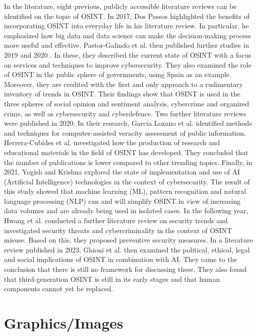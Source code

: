 \documentclass[10pt]{article}
\begin{document}
In the literature, eight previous, publicly accessible literature reviews can be identified on the topic of OSINT. In 2017, Dos Passos \cite{DosPassos.2017} highlighted the benefits of incorporating OSINT into everyday life in his literature review. In particular, he emphasized how big data and data science can make the decision-making process more useful and effective. Pastor-Galindo et al. then published further studies in 2019 \cite{PastorGalindo.2019} and 2020 \cite{PastorGalindo.2020}. In these, they described the current state of OSINT with a focus on services and techniques to improve cybersecurity. They also examined the role of OSINT in the public sphere of governments, using Spain as an example. Moreover, they are credited with the first and only approach to a rudimentary inventory of trends in OSINT. Their findings show that OSINT is used in the three spheres of social opinion and sentiment analysis, cybercrime and organized crime, as well as cybersecurity and cyberdefence. Two further literature reviews were published in 2020. In their research, García Lozano et al. \cite{GarciaLozano.2020} identified methods and techniques for computer-assisted veracity assessment of public information. Herrera-Cubides et al. \cite{HerreraCubides.2020} investigated how the production of research and educational materials in the field of OSINT has developed. They concluded that the number of publications is lower compared to other trending topics. Finally, in 2021, Yogish and Krishna \cite{Yogish.2021} explored the state of implementation and use of AI (Artificial Intelligence) technologies in the context of cybersecurity. The result of this study showed that machine learning (ML), pattern recognition and natural language processing (NLP) can and will simplify OSINT in view of increasing data volumes and are already being used in isolated cases. In the following year, Hwang et al. \cite{Hwang.2022} conducted a further literature review on security trends and investigated security threats and cybercriminality in the context of OSINT misuse. Based on this, they proposed preventive security measures. In a literature review published in 2023, Ghioni et al. \cite{Ghioni.2023} then examined the political, ethical, legal and social implications of OSINT in combination with AI. They came to the conclusion that there is still no framework for discussing these. They also found that third-generation OSINT is still in its early stages and that human components cannot yet be replaced.



\section{Graphics/Images}
\end{document}
